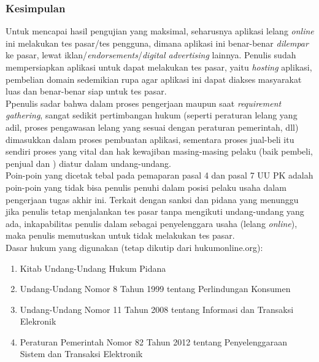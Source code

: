 \subsubsection{Kesimpulan}
	\indent Untuk mencapai hasil pengujian yang maksimal, seharusnya aplikasi lelang \textit{online} ini melakukan tes pasar/tes pengguna, dimana aplikasi ini benar-benar \textit{dilempar} ke pasar, lewat iklan/\textit{endorsements}/\textit{digital advertising} lainnya. Penulis sudah mempersiapkan aplikasi untuk dapat melakukan tes pasar, yaitu \textit{hosting} aplikasi, pembelian domain sedemikian rupa agar aplikasi ini dapat diakses masyarakat luas dan benar-benar siap untuk tes pasar.\\
	\indent Ppenulis sadar bahwa dalam proses pengerjaan maupun saat \textit{requirement gathering}, sangat sedikit pertimbangan hukum (seperti peraturan lelang yang adil, proses pengawasan lelang yang sesuai dengan peraturan pemerintah, dll) dimasukkan dalam proses pembuatan aplikasi, sementara proses jual-beli itu sendiri proses yang vital dan hak kewajiban masing-masing pelaku (baik pembeli, penjual dan ) diatur dalam undang-undang. \\ 
	\indent Poin-poin yang dicetak tebal pada pemaparan pasal 4 dan pasal 7 UU PK adalah poin-poin yang tidak bisa penulis penuhi dalam posisi pelaku usaha dalam pengerjaan tugas akhir ini. Terkait dengan sanksi dan pidana yang menunggu jika penulis tetap menjalankan tes pasar tanpa mengikuti undang-undang yang ada, inkapabilitas penulis dalam sebagai penyelenggara usaha (lelang \textit{online}), maka penulis memutuskan untuk tidak melakukan tes pasar.
	\\

	Dasar hukum yang digunakan (tetap dikutip dari hukumonline.org):
	\begin{enumerate}
		\item Kitab Undang-Undang Hukum Pidana
		\item Undang-Undang Nomor 8 Tahun 1999 tentang Perlindungan Konsumen
		\item Undang-Undang Nomor 11 Tahun 2008 tentang Informasi dan Transaksi Elekronik
		\item Peraturan Pemerintah Nomor 82 Tahun 2012 tentang Penyelenggaraan Sistem dan Transaksi Elektronik
	\end{enumerate}
